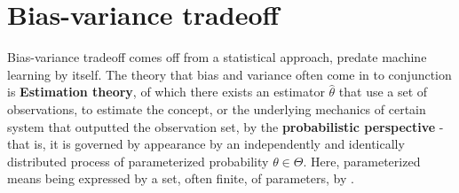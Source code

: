 \documentclass{article}
\begin{document}
\clearpage
\section{Bias-variance tradeoff}

Bias-variance tradeoff comes off from a statistical approach, predate machine learning by itself. The theory that bias and variance often come in to conjunction is \textbf{Estimation theory}, of which there exists an estimator $\hat{\theta}$ that use a set of observations, to estimate the concept, or the underlying mechanics of certain system that outputted the observation set, by the \textbf{probabilistic perspective} - that is, it is governed by appearance by an independently and identically distributed process of parameterized probability $\theta\in \Theta$. Here, parameterized means being expressed by a set, often finite, of parameters, by \cite{LehmannCasella_theory_1998,liam_statistics_2005}. 
\end{document}
